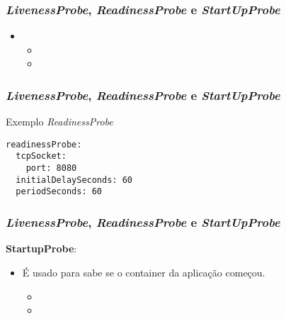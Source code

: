 \begin{frame}
	\frametitle{\textit{LivenessProbe}, \textit{ReadinessProbe} e \textit{StartUpProbe}}

\begin{itemize}
	\item {}
	\begin{itemize}
		\item {}
		\item {}
	\end{itemize}
\end{itemize}
\end{frame}

\begin{frame}[containsverbatim]
\frametitle{\textit{LivenessProbe}, \textit{ReadinessProbe} e \textit{StartUpProbe}}
\begin{center}
\begin{minipage}{0.9\textwidth}
\begin{block}{Exemplo \textit{ReadinessProbe}}
\begin{lstlisting}
readinessProbe:
  tcpSocket:
    port: 8080
  initialDelaySeconds: 60
  periodSeconds: 60
\end{lstlisting}
\end{block}
\end{minipage}
\end{center}
\end{frame}

\begin{frame}
\frametitle{\textit{LivenessProbe}, \textit{ReadinessProbe} e \textit{StartUpProbe}}
\textbf{StartupProbe}:
\begin{itemize}
	\item É usado para sabe se o container da aplicação começou.
	\begin{itemize}
		\item {}
		\item {}
	\end{itemize}
\end{itemize}
\end{frame}
